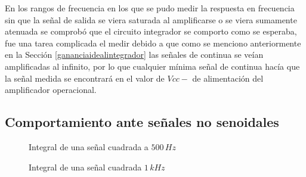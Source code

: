 En los rangos de frecuencia en los que se pudo medir la respuesta en frecuencia sin que la señal de salida se viera saturada al amplificarse o se viera sumamente atenuada se comprobó que el circuito integrador se comporto como se esperaba, fue una tarea complicada el medir debido a que como se menciono anteriormente en la Sección \ref{gananciaidealintegrador} las señales de continua se veían amplificadas al infinito, por lo que cualquier mínima señal de continua hacía que la señal medida se encontrará en el valor de $V{cc-}$ de alimentación del amplificador operacional.

\subsection{Comportamiento ante señales no senoidales}

\begin{figure}[H]
	\begin{center}
		\caption{Integral de una señal cuadrada a $500 \, Hz$}
		\label{fig:IntegralNOcomp500Hz}
	\end{center}
\end{figure}

\begin{figure}[H]
	\begin{center}
		\caption{Integral de una señal cuadrada $1 \, kHz$}
		\label{fig:IntegralNOcomp1kHz}
	\end{center}
\end{figure}

